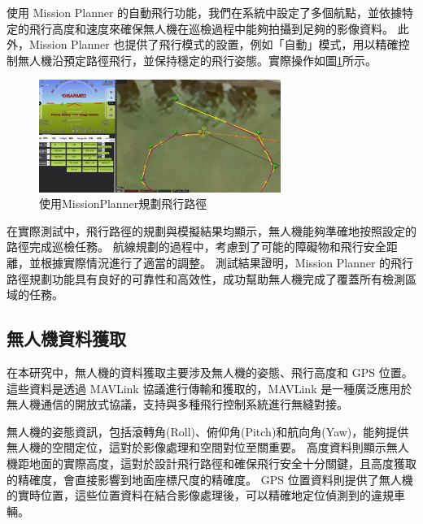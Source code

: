 \documentclass[12pt]{article}       %
\begin{document}
使用 Mission Planner 的自動飛行功能，我們在系統中設定了多個航點，並依據特定的飛行高度和速度來確保無人機在巡檢過程中能夠拍攝到足夠的影像資料。
此外，Mission Planner 也提供了飛行模式的設置，例如「自動」模式，用以精確控制無人機沿預定路徑飛行，並保持穩定的飛行姿態。實際操作如圖\ref{fig:missionplanner2}所示。

\begin{figure}[H]
    \centering
    \includegraphics[width=0.7\textwidth]{missionplanner2.jpg}     %
    \caption{使用MissionPlanner規劃飛行路徑}    %
    \label{fig:missionplanner2}    %
\end{figure}

在實際測試中，飛行路徑的規劃與模擬結果均顯示，無人機能夠準確地按照設定的路徑完成巡檢任務。
航線規劃的過程中，考慮到了可能的障礙物和飛行安全距離，並根據實際情況進行了適當的調整。
測試結果證明，Mission Planner 的飛行路徑規劃功能具有良好的可靠性和高效性，成功幫助無人機完成了覆蓋所有檢測區域的任務。

\subsection{無人機資料獲取}
\hspace{2em}
在本研究中，無人機的資料獲取主要涉及無人機的姿態、飛行高度和 GPS 位置。
這些資料是透過 MAVLink 協議進行傳輸和獲取的，MAVLink 是一種廣泛應用於無人機通信的開放式協議，支持與多種飛行控制系統進行無縫對接。

無人機的姿態資訊，包括滾轉角(Roll)、俯仰角(Pitch)和航向角(Yaw)，能夠提供無人機的空間定位，這對於影像處理和空間對位至關重要。
高度資料則顯示無人機距地面的實際高度，這對於設計飛行路徑和確保飛行安全十分關鍵，且高度獲取的精確度，會直接影響到地面座標尺度的精確度。
GPS 位置資料則提供了無人機的實時位置，這些位置資料在結合影像處理後，可以精確地定位偵測到的違規車輛。
\end{document}
